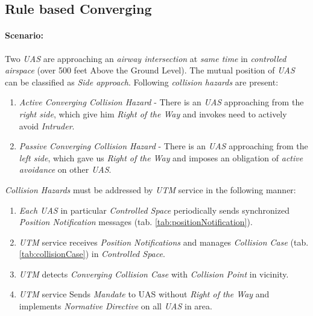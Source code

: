 \subsection{Rule based Converging}\label{s:testRuleConverging}

\paragraph{Scenario:} Two \emph{UAS} are approaching an \emph{airway intersection} at \emph{same time} in \emph{controlled airspace} (over 500 feet Above the Ground Level). The mutual position of \emph{UAS} can be classified as \emph{Side approach}. Following \emph{collision hazards} are present:

\begin{enumerate}
    \item \emph{Active Converging Collision Hazard} -  There is an \emph{UAS} approaching from the \emph{right side}, which give him \emph{Right of the Way} and invokes need to actively avoid \emph{Intruder}.

	\item \emph{Passive Converging Collision Hazard} - There is an \emph{UAS} approaching from the \emph{left side}, which gave us \emph{Right of the Way} and imposes an obligation of \emph{active avoidance} on other \emph{UAS}.
	
\end{enumerate}


\noindent\emph{Collision Hazards} must be addressed by \emph{UTM} service in the following manner:


\begin{enumerate}
	\item \emph{Each UAS} in particular \emph{Controlled Space} periodically sends synchronized \emph{Position Notification} messages (tab. \ref{tab:positionNotification}). 
	
	\item \emph{UTM} service receives \emph{Position Notifications} and manages \emph{Collision Case} (tab. \ref{tab:collisionCase}) in \emph{Controlled Space}. 
	
	\item \emph{UTM} detects \emph{Converging Collision Case} with \emph{Collision Point} in  vicinity.
	
	\item \emph{UTM} service Sends \emph{Mandate} to UAS without \emph{Right of the Way} and implements \emph{Normative Directive} on all \emph{UAS} in area.
\end{enumerate}


